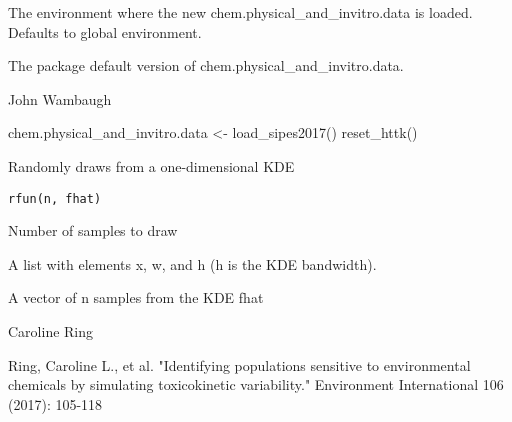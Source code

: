 \documentclass[a4paper]{book}
\begin{document}
%
\begin{Arguments}
\begin{ldescription}
\item[\code{target.env}] The environment where the new
chem.physical\_and\_invitro.data is loaded. Defaults to global environment.
\end{ldescription}
\end{Arguments}
%
\begin{Value}
\begin{ldescription}
\item[\code{data.frame}] The package default version of 
chem.physical\_and\_invitro.data.
\end{ldescription}
\end{Value}
%
\begin{Author}\relax
John Wambaugh
\end{Author}
%
\begin{Examples}
\begin{ExampleCode}


chem.physical_and_invitro.data <- load_sipes2017()
reset_httk()
                        

\end{ExampleCode}
\end{Examples}
%
\begin{Description}\relax
Randomly draws from a one-dimensional KDE
\end{Description}
%
\begin{Usage}
\begin{verbatim}
rfun(n, fhat)
\end{verbatim}
\end{Usage}
%
\begin{Arguments}
\begin{ldescription}
\item[\code{n}] Number of samples to draw

\item[\code{fhat}] A list with elements x, w, and h (h is the KDE bandwidth).
\end{ldescription}
\end{Arguments}
%
\begin{Value}
A vector of n samples from the KDE fhat
\end{Value}
%
\begin{Author}\relax
Caroline Ring
\end{Author}
%
\begin{References}\relax
Ring, Caroline L., et al. "Identifying populations sensitive to
environmental chemicals by simulating toxicokinetic variability."
Environment International 106 (2017): 105-118
\end{References}
\end{document}
